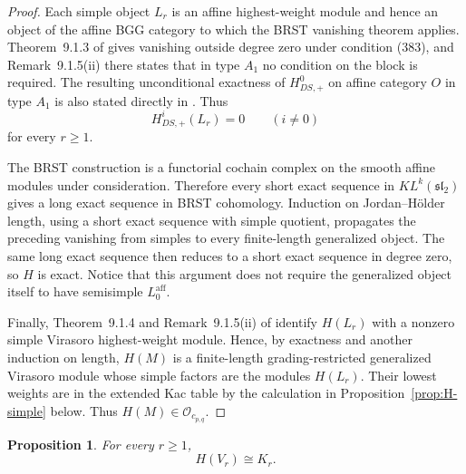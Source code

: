 \documentclass[12pt,leqno]{amsart}
\numberwithin{equation}{section}
\newtheorem{prop}[thm]{Proposition}
\newcommand{\KL}{KL}
\newcommand{\Oc}{\mathcal O}
\begin{document}
\begin{proof}
Each simple object $L_r$ is an affine highest-weight module and hence an
object of the affine BGG category to which the BRST vanishing theorem
applies.  Theorem~9.1.3 of \cite{ArakawaW} gives vanishing outside degree
zero under condition (383), and Remark~9.1.5(ii) there states that in type
$A_1$ no condition on the block is required.  The resulting unconditional
exactness of $H^0_{DS,+}$ on affine category $O$ in type $A_1$ is also stated
directly in \cite[Section~4.4, discussion preceding formula~(4.20)]
{ArakawaFrenkel}.  Thus
\[
 H^i_{DS,+}(L_r)=0\qquad(i\neq0)
\]
for every $r\geq1$.

The BRST construction is a functorial cochain complex on the smooth affine
modules under consideration.  Therefore every short exact sequence in
$\KL^k(\mathfrak{sl}_2)$ gives a long exact sequence in BRST cohomology.
Induction on Jordan--H\"older length, using a short exact sequence with
simple quotient, propagates the preceding vanishing from simples to every
finite-length generalized object.  The same long exact sequence then
reduces to a short exact sequence in degree zero, so $H$ is exact.  Notice
that this argument does not require the generalized object itself to have
semisimple $L^{\mathrm{aff}}_0$.

Finally, Theorem~9.1.4 and Remark~9.1.5(ii) of \cite{ArakawaW} identify
$H(L_r)$ with a nonzero simple Virasoro highest-weight module.  Hence, by
exactness and another induction on length, $H(M)$ is a finite-length
grading-restricted generalized Virasoro module whose simple factors are the
modules $H(L_r)$.  Their lowest weights are in the extended Kac table by
the calculation in Proposition~\ref{prop:H-simple} below.  Thus
$H(M)\in\Oc_{c_{p,q}}$.
\end{proof}

\begin{prop}\label{prop:H-Weyl}
For every $r\geq1$,
\[
 H(V_r)\cong K_r.
\]
\end{prop}
\end{document}
